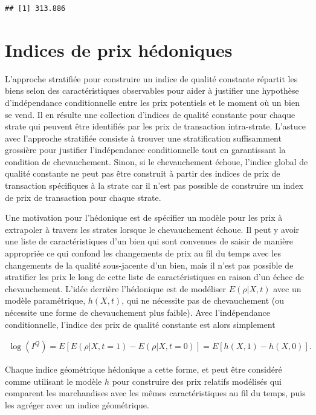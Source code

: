 \documentclass[
]{article}
\begin{document}
\begin{verbatim}
## [1] 313.886
\end{verbatim}

\hypertarget{indices-de-prix-huxe9doniques}{%
\section{Indices de prix hédoniques}\label{indices-de-prix-huxe9doniques}}

L'approche stratifiée pour construire un indice de qualité constante répartit les biens selon des caractéristiques observables pour aider à justifier une hypothèse d'indépendance conditionnelle entre les prix potentiels et le moment où un bien se vend. Il en résulte une collection d'indices de qualité constante pour chaque strate qui peuvent être identifiés par les prix de transaction intra-strate. L'astuce avec l'approche stratifiée consiste à trouver une stratification suffisamment grossière pour justifier l'indépendance conditionnelle tout en garantissant la condition de chevauchement. Sinon, si le chevauchement échoue, l'indice global de qualité constante ne peut pas être construit à partir des indices de prix de transaction spécifiques à la strate car il n'est pas possible de construire un index de prix de transaction pour chaque strate.

Une motivation pour l'hédonique est de spécifier un modèle pour les prix à extrapoler à travers les strates lorsque le chevauchement échoue. Il peut y avoir une liste de caractéristiques d'un bien qui sont convenues de saisir de manière appropriée ce qui confond les changements de prix au fil du temps avec les changements de la qualité sous-jacente d'un bien, mais il n'est pas possible de stratifier les prix le long de cette liste de caractéristiques en raison d'un échec de chevauchement. L'idée derrière l'hédonique est de modéliser \(E(\rho | X, t)\) avec un modèle paramétrique, \(h(X, t)\), qui ne nécessite pas de chevauchement (ou nécessite une forme de chevauchement plus faible). Avec l'indépendance conditionnelle, l'indice des prix de qualité constante est alors simplement

\begin{align*}
\log (I^{Q}) = E[E(\rho | X, t = 1) - E(\rho | X, t = 0)] = E[h(X, 1) - h(X, 0)].
\end{align*}

Chaque indice géométrique hédonique a cette forme, et peut être considéré comme utilisant le modèle \(h\) pour construire des prix relatifs modélisés qui comparent les marchandises avec les mêmes caractéristiques au fil du temps, puis les agréger avec un indice géométrique.
\end{document}
